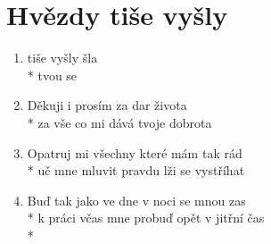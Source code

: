 \section{Hvězdy tiše vyšly}
\begin{enumerate}
\item {} tiše vyšly  šla  \\*
 tvou   se  
\item Děkuji i prosím za dar života \\*
za vše co mi dává tvoje dobrota 
\item Opatruj mi všechny které mám tak rád \\*
uč mne mluvit pravdu lži se vystříhat 
\item Buď tak jako ve dne v noci se mnou zas \\*
k práci včas mne probuď opět v jitřní čas \\*
\end{enumerate}
